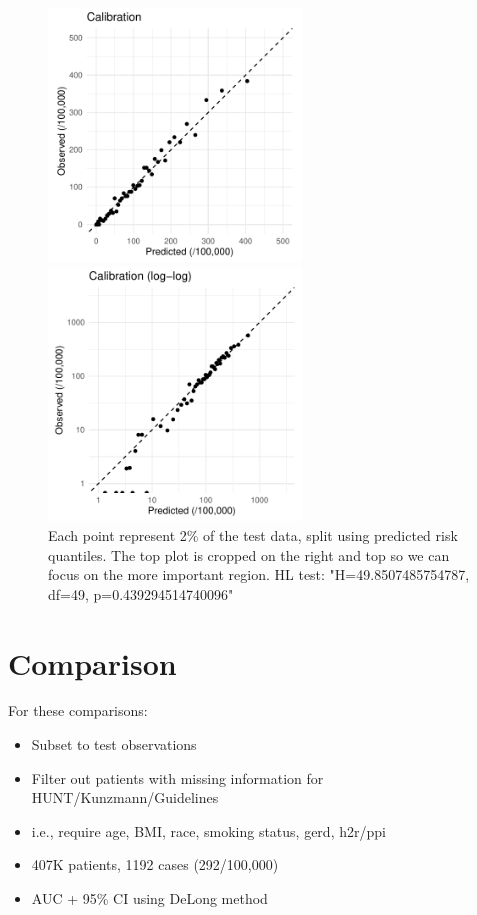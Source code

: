 \documentclass[12pt]{article}
\begin{document}
\begin{figure}[h]
\centering
\includegraphics[width=0.6\textwidth]{figures/calibration50_all_zoom.pdf}
\includegraphics[width=0.6\textwidth]{figures/calibration50_all_log.pdf} \\
Each point represent 2\% of the test data, split using predicted risk quantiles. The top plot is cropped on the right and top
 so we can focus on the more important region. HL test: "H=49.8507485754787, df=49, p=0.439294514740096"

\end{figure}


\clearpage
\section*{Comparison}


For these comparisons:
\begin{itemize}
\item Subset to test observations
\item Filter out patients with missing information for HUNT/Kunzmann/Guidelines
\item i.e., require age, BMI, race, smoking status, gerd, h2r/ppi
\item 407K patients, 1192 cases (292/100,000)
\item AUC + 95\% CI using DeLong method
\end{itemize}
\end{document}
